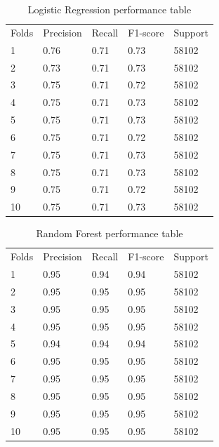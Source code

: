 \documentclass[12pt]{report}
\begin{document}
\begin{table}
\centering
\caption{Logistic Regression performance table}
\label{my-label}
\begin{tabular}{lllll}
 Folds&  Precision&  Recall&  F1-score& Support \\
 1&  0.76&  0.71&  0.73& 58102 \\
 2& 0.73 &  0.71&  0.73&  58102\\
 3&  0.75&  0.71&  0.72& 58102\\
 4& 0.75&  0.71&  0.73& 58102\\
 5& 0.75&  0.71&  0.73& 58102\\
 6& 0.75&  0.71&  0.72& 58102\\
 7& 0.75&  0.71&  0.73& 58102\\
 8& 0.75&  0.71&  0.73& 58102\\
 9& 0.75&  0.71&  0.72& 58102\\
 10& 0.75&  0.71&  0.73& 58102\\
\end{tabular}
\end{table}
\begin{table}
\centering
\caption{Random Forest performance table}
\label{my-label}
\begin{tabular}{lllll}
 Folds&  Precision&  Recall&  F1-score& Support \\
 1&  0.95&  0.94&  0.94& 58102 \\
 2& 0.95 &  0.95&  0.95&  58102\\
 3&  0.95&  0.95&  0.95& 58102\\
 4& 0.95&  0.95&  0.95& 58102\\
 5& 0.94&  0.94&  0.94& 58102\\
 6& 0.95&  0.95&  0.95& 58102\\
 7& 0.95&  0.95&  0.95& 58102\\
 8& 0.95&  0.95&  0.95& 58102\\
 9& 0.95&  0.95&  0.95& 58102\\
 10& 0.95&  0.95&  0.95& 58102\\
\end{tabular}
\end{table}
\end{document}
